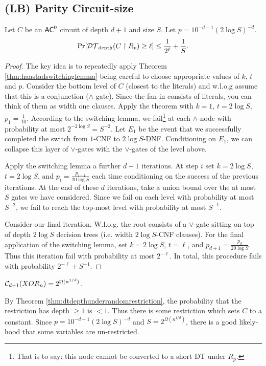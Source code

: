 \documentclass[11pt]{article}
\begin{document}
	\subsection{(LB) Parity Circuit-size}
	\begin{theorem}
		\label{thm:dtdepthunderrandomrestriction}
		Let $C$ be an $\mathsf{AC}^0$ circuit of depth $d + 1$ and size $S$. Let $p = 10^{-d - 1}(2\log S)^{-d}$.
		\[\Pr[\mathcal{DT}_{\mathrm{depth}}(C \upharpoonright R_p) \geq \ell] \leq \frac{1}{2^\ell} + \frac{1}{S}.\] 
	\end{theorem}
	\begin{proof}
		The key idea is to repeatedly apply Theorem \ref{thm:haastadswitchinglemma} being careful to choose appropriate values of $k$, $t$ and $p$. Consider the bottom level of $C$ (closest to the literals) and w.l.o.g assume that this is a conjunction ($\land$-gate). Since the fan-in consists of literals, you can think of them as width one clauses. Apply the theorem with $k = 1$, $t = 2\log S$, $p_1 = \frac{1}{10}$. According to the switching lemma, we fail\footnote{That is to say: this node cannot be converted to a short DT under $R_p$.} at each $\land$-node with probability at most $2^{-2\log S} = S^{-2}$. Let $E_1$ be the event that we successfully completed the switch from $1$-CNF to $2\log S$-DNF. Conditioning on $E_1$, we can collapse this layer of $\lor$-gates with the $\lor$-gates of the level above. 
		
		Apply the switching lemma a further $d-1$ iterations. At step $i$ set $k = 2\log S$, $t = 2\log S$, and $p_{i} = \frac{p_{i-1}}{20\log S}$ each time conditioning on the success of the previous iterations. At the end of these $d$ iterations, take a union bound over the at most $S$ gates we have considered. Since we fail on each level with probability at most $S^{-2}$, we fail to reach the top-most level with probability at most $S^{-1}$. 
		
		Consider our final iteration. W.l.o.g. the root consists of a $\lor$-gate sitting on top of depth $2\log S$ decision trees (i.e. width $2\log S$-CNF clauses). For the final application of the switching lemma, set $k = 2\log S$, $t = \ell$, and $p_{d+1} = \frac{p_d}{20\log S}$. Thus this iteration fail with probability at most $2^{-\ell}$. In total, this procedure fails with probability $2^{-\ell} + S^{-1}$.
	\end{proof}
	
	\begin{corollary}
		$\mathcal{C}_{d+1}(XOR_n) = 2^{\Omega(n^{1/d})}$.
	\end{corollary}
	By Theorem \ref{thm:dtdepthunderrandomrestriction}, the probability that the restriction has depth $\geq 1$ is $< 1$. Thus there is some restriction which sets $C$ to a constant. Since $p = 10^{-d-1}(2\log S)^{-d}$ and $S = 2^{\Omega(n^{1/d})}$, there is a good likely-hood that some variables are un-restricted.
	
\end{document}

